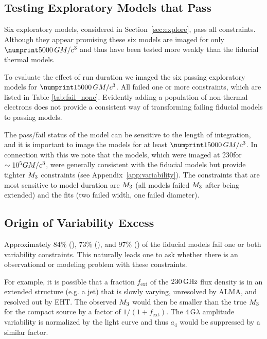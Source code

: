 \subsection{Testing Exploratory Models that Pass}

Six exploratory models, considered in Section~\ref{sec:explore},  pass all constraints.
Although they appear promising these six models are imaged for only $\no{5000}\,\tg$ and thus have been tested more weakly than the fiducial thermal models.

To evaluate the effect of run duration we imaged the six passing exploratory models for  $\no{15000}\,\tg$.
All failed one or more constraints, which are listed in Table \ref{tab:fail_none}.  
Evidently adding a population of non-thermal electrons does not provide a consistent way of transforming failing fiducial models to passing models.  

The pass/fail status of the model can be sensitive to the length of integration, and it is important to image the models for at least $\no{15000}\,\tg$.
In connection with this we note that the \koral models, which were imaged at 230\GHz for $\sim 10^5 GM/c^3$, were generally consistent with the fiducial models but provide tighter $M_{3}$ constraints (see Appendix~\ref{app:variability}).
The constraints that are most sensitive to model duration are $M_{3}$ (all models failed $M_{3}$ after being extended) and the \mring fits (two failed \mring width, one failed \mring diameter).

\subsection{Origin of Variability Excess}

Approximately 84\% (\kharma), 73\% (\bhac), and 97\% (\hamr) of the fiducial models fail one or both variability constraints.
This naturally leads one to ask whether there is an observational or modeling problem with these constraints.

For example, it is possible that a fraction $f_\mathrm{ext}$ of the $230\,\mathrm{GHz}$ flux density is in an extended structure (e.g. a jet) that is slowly varying, unresolved by ALMA, and resolved out by EHT.
The observed $M_{3}$ would then be smaller than the true $M_{3}$ for the compact source by a factor of $1/(1 + f_\mathrm{ext})$.
The $4\,\mathrm{G}\lambda$ amplitude variability is normalized by the light curve and thus $a_4$ would be suppressed by a similar factor.

